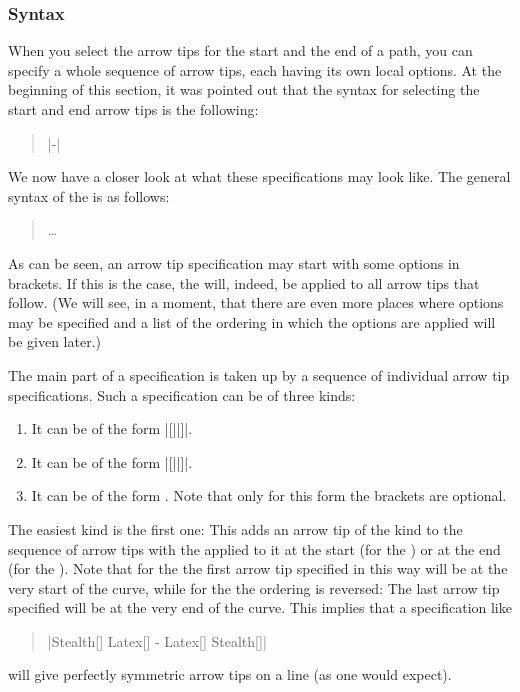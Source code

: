\subsubsection{Syntax}

When you select the arrow tips for the start and the end of a path, you can
specify a whole sequence of arrow tips, each having its own local options. At
the beginning of this section, it was pointed out that the syntax for selecting
the start and end arrow tips is the following:
%
\begin{quote}
    |-|
\end{quote}

We now have a closer look at what these specifications may look like. The
general syntax of the  is as follows:
%
\begin{quote}
     
      \dots
\end{quote}
%
As can be seen, an arrow tip specification may start with some options in
brackets. If this is the case, the  will, indeed, be
applied to all arrow tips that follow. (We will see, in a moment, that there
are even more places where options may be specified and a list of the ordering
in which the options are applied will be given later.)

The main part of a specification is taken up by a sequence of individual arrow
tip specifications. Such a specification can be of three kinds:
%
\begin{enumerate}
    \item It can be of the form |[||]|.
    \item It can be of the form |[||]|.
    \item It can be of the form . Note that only for this form
        the brackets are optional.
\end{enumerate}

The easiest kind is the first one: This adds an arrow tip of the kind
 to the sequence of arrow tips with the
 applied to it at the start (for the )
or at the end (for the ). Note that for the  the first arrow tip specified in this way will be at the very
start of the curve, while for the  the ordering is
reversed: The last arrow tip specified will be at the very end of the curve.
This implies that a specification like
%
\begin{quote}
    |Stealth[] Latex[] - Latex[] Stealth[]|
\end{quote}
%
will give perfectly symmetric arrow tips on a line (as one would expect).

